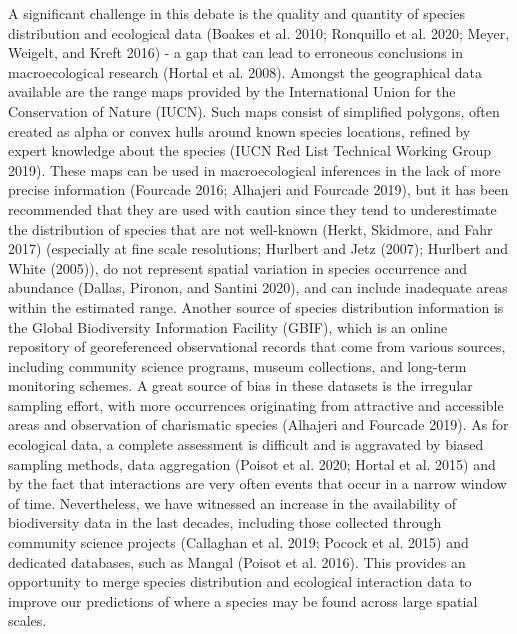 \documentclass[10pt,oneside]{article}
\begin{document}
A significant challenge in this debate is the quality and quantity of
species distribution and ecological data (Boakes et al. 2010; Ronquillo
et al. 2020; Meyer, Weigelt, and Kreft 2016) - a gap that can lead to
erroneous conclusions in macroecological research (Hortal et al. 2008).
Amongst the geographical data available are the range maps provided by
the International Union for the Conservation of Nature (IUCN). Such maps
consist of simplified polygons, often created as alpha or convex hulls
around known species locations, refined by expert knowledge about the
species (IUCN Red List Technical Working Group 2019). These maps can be
used in macroecological inferences in the lack of more precise
information (Fourcade 2016; Alhajeri and Fourcade 2019), but it has been
recommended that they are used with caution since they tend to
underestimate the distribution of species that are not well-known
(Herkt, Skidmore, and Fahr 2017) (especially at fine scale resolutions;
Hurlbert and Jetz (2007); Hurlbert and White (2005)), do not represent
spatial variation in species occurrence and abundance (Dallas, Pironon,
and Santini 2020), and can include inadequate areas within the estimated
range. Another source of species distribution information is the Global
Biodiversity Information Facility (GBIF), which is an online repository
of georeferenced observational records that come from various sources,
including community science programs, museum collections, and long-term
monitoring schemes. A great source of bias in these datasets is the
irregular sampling effort, with more occurrences originating from
attractive and accessible areas and observation of charismatic species
(Alhajeri and Fourcade 2019). As for ecological data, a complete
assessment is difficult and is aggravated by biased sampling methods,
data aggregation (Poisot et al. 2020; Hortal et al. 2015) and by the
fact that interactions are very often events that occur in a narrow
window of time. Nevertheless, we have witnessed an increase in the
availability of biodiversity data in the last decades, including those
collected through community science projects (Callaghan et al. 2019;
Pocock et al. 2015) and dedicated databases, such as Mangal (Poisot et
al. 2016). This provides an opportunity to merge species distribution
and ecological interaction data to improve our predictions of where a
species may be found across large spatial scales.
\end{document}

